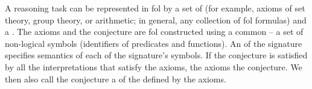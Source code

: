 
A reasoning task can be represented in \gls{fol} by a set of  (for example, axioms of set theory, group theory, or arithmetic; in general, any collection of \gls{fol} formulas) and a .
The axioms and the conjecture are \gls{fol}  constructed using a common  -- a set of non-logical symbols (identifiers of predicates and functions).
An  of the signature specifies semantics of each of the signature's symbols.
If the conjecture is satisfied by all the interpretations that satisfy the axioms,
the axioms  the conjecture.
We then also call the conjecture a  of the  defined by the axioms.


